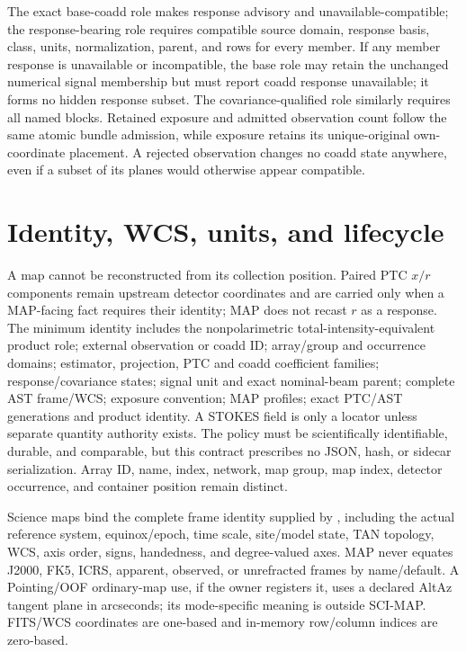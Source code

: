 \documentclass[10pt]{article}
\begin{document}
The exact base-coadd role makes response advisory and unavailable-compatible;
the response-bearing role requires compatible source domain, response basis,
class, units, normalization, parent, and rows for every member. If any member
response is unavailable or incompatible, the base role may retain the
unchanged numerical signal membership but must report coadd response
unavailable; it forms no hidden response subset. The covariance-qualified
role similarly requires all named blocks. Retained exposure and admitted
observation count follow the same atomic bundle admission, while exposure
retains its unique-original own-coordinate placement.
A rejected observation changes no
coadd state anywhere, even if a subset of its planes would otherwise appear
compatible.

\clearpage
\section{Identity, WCS, units, and lifecycle}

A map cannot be reconstructed from its collection position. Paired PTC
\(x/r\) components remain upstream detector coordinates and are carried only
when a MAP-facing fact requires their identity; MAP does not recast \(r\) as a
response. The minimum
identity includes the nonpolarimetric total-intensity-equivalent product role;
external observation or coadd ID; array/group and occurrence domains;
estimator, projection, PTC and coadd coefficient families; response/covariance
states; signal unit and exact nominal-beam parent; complete AST frame/WCS;
exposure convention; MAP profiles; exact PTC/AST generations and product
identity. A STOKES field is only a locator unless separate quantity authority exists. The policy must
be scientifically identifiable, durable, and comparable, but this contract
prescribes no JSON, hash, or sidecar serialization. Array ID, name, index,
network, map group, map index,
detector occurrence, and container position remain distinct.

Science maps bind the complete frame identity supplied by
\SCIMapASTRTCGridProfile, including the actual reference
system, equinox/epoch, time scale, site/model state, TAN topology, WCS, axis
order, signs, handedness, and degree-valued axes. MAP never equates J2000,
FK5, ICRS, apparent, observed, or unrefracted frames by name/default. A
Pointing/OOF ordinary-map use, if the owner registers it, uses
a declared AltAz tangent plane in arcseconds; its mode-specific meaning is
outside SCI-MAP. FITS/WCS coordinates are one-based and in-memory row/column
indices are zero-based.
\end{document}
